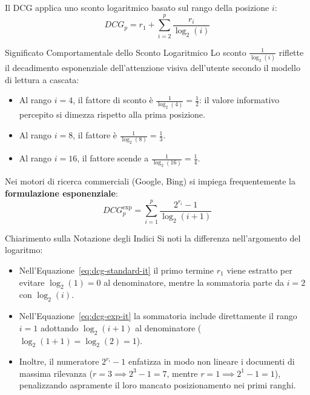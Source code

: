 \begin{definition}
Il DCG applica uno sconto logaritmico basato sul rango della posizione $i$:
\begin{equation}
DCG_p = r_1 + \sum_{i=2}^p \frac{r_i}{\log_2(i)}
\label{eq:dcg-standard-it}
\end{equation}
\end{definition}

\begin{alertblock}{Significato Comportamentale dello Sconto Logaritmico}
Lo sconto $\frac{1}{\log_2(i)}$ riflette il decadimento esponenziale dell'attenzione visiva dell'utente secondo il modello di lettura a cascata:
\begin{itemize}
    \item Al rango $i = 4$, il fattore di sconto è $\frac{1}{\log_2(4)} = \frac{1}{2}$: il valore informativo percepito si dimezza rispetto alla prima posizione.
    \item Al rango $i = 8$, il fattore è $\frac{1}{\log_2(8)} = \frac{1}{3}$.
    \item Al rango $i = 16$, il fattore scende a $\frac{1}{\log_2(16)} = \frac{1}{4}$.
\end{itemize}
\end{alertblock}

Nei motori di ricerca commerciali (Google, Bing) si impiega frequentemente la \textbf{formulazione esponenziale}:
\begin{equation}
DCG_p^{\text{exp}} = \sum_{i=1}^p \frac{2^{r_i} - 1}{\log_2(i + 1)}
\label{eq:dcg-exp-it}
\end{equation}
\begin{noteblock}{Chiarimento sulla Notazione degli Indici}
Si noti la differenza nell'argomento del logaritmo:
\begin{itemize}
    \item Nell'Equazione~\eqref{eq:dcg-standard-it} il primo termine $r_1$ viene estratto per evitare $\log_2(1) = 0$ al denominatore, mentre la sommatoria parte da $i=2$ con $\log_2(i)$.
    \item Nell'Equazione~\eqref{eq:dcg-exp-it} la sommatoria include direttamente il rango $i=1$ adottando $\log_2(i+1)$ al denominatore ($\log_2(1+1) = \log_2(2) = 1$).
    \item Inoltre, il numeratore $2^{r_i} - 1$ enfatizza in modo non lineare i documenti di massima rilevanza ($r=3 \implies 2^3 - 1 = 7$, mentre $r=1 \implies 2^1 - 1 = 1$), penalizzando aspramente il loro mancato posizionamento nei primi ranghi.
\end{itemize}
\end{noteblock}

